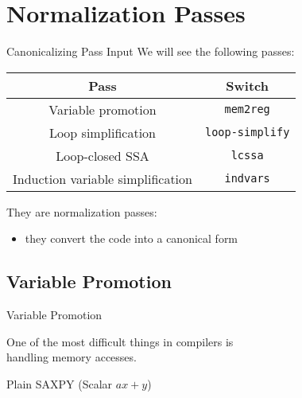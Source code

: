 
\section{Normalization Passes}


\begin{frame}{Canonicalizing Pass Input}
We will see the following passes:

\begin{table}
\centering
\begin{tabular}{cc}
\toprule

\multicolumn{1}{c}{\textbf{Pass}}    &
\multicolumn{1}{c}{\textbf{Switch}} \\

\midrule

Variable promotion  &
\texttt{mem2reg}   \\

Loop simplification &
\texttt{loop-simplify} \\

Loop-closed SSA  &
\texttt{lcssa}  \\

Induction variable simplification  &
\texttt{indvars}                  \\

\bottomrule
\end{tabular}
\end{table}

They are \alert{normalization} passes:

\begin{itemize}
\item they convert the code into a canonical form
\end{itemize}
\end{frame}


\subsection{Variable Promotion}


\begin{frame}{Variable Promotion}
\begin{center}
One of the most difficult things in compilers is\\\alert{handling memory accesses}.
\end{center}
\vfill
\begin{block}{Plain SAXPY (Scalar $ax + y$)}
\centering
{}
\end{block}
\end{frame}


